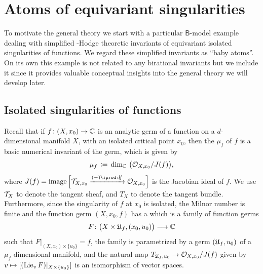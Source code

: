 \documentclass[twoside,leqno]{article}
\numberwithin{equation}{section}
\theoremstyle{plain}
\theoremstyle{definition}
\begin{document}




\section{Atoms of equivariant singularities} \label{sec:Bmodel}

To motivate the general theory we start with a particular $\mathsf{B}$-model example dealing with  simplified  \nc-Hodge theoretic invariants of equivariant isolated singularities of functions. We  regard these simplified invariants as ``baby atoms''. On its own this example is not related to any birational invariants but we include it since it provides valuable conceptual insights into the general theory we will develop later.

\subsection{Isolated singularities of functions} \label{ssec:fx0}

Recall that if $f \colon (X,x_{0}) \to \mathbb C$ is an analytic germ of a function on a $d$-dimensional manifold $X$, with an isolated critical point $x_{0}$, then the  $\mu_{f}$ of $f$ is a basic numerical invariant of the germ, which is given by 
\[
\mu_{f} \, \coloneqq \, \dim_{\mathbb C} \, \big( \mathcal O_{X,x_{0}}/J(f)\big),
\]
where $J(f)=\op{image}\Big[\cT_{X, x_0} \xrightarrow{(-)\iprod \, df} \cO_{X,x_0} \Big]$ is the Jacobian ideal of $f$.
We use $\mathcal T_X$ to denote the tangent sheaf, and $T_X$ to denote the tangent bundle.
Furthermore, since the singularity of $f$ at $x_{0}$ is isolated, the Milnor number is finite and the function germ $(X,x_{0},f)$ has a  which is a family of function germs
\[
F \colon \big(X\times \mathfrak{U}_{f},(x_{0},u_{0})\big) \longrightarrow \mathbb C
\]
such that $F|_{(X,x_{0})\times\{u_{0}\}} = f$, the family is parametrized by a germ $(\mathfrak{U}_{f},u_{0})$ of a $\mu_{f}$-dimensional mani\-fold, and the natural map 
$T_{\mathfrak{U}_{f},u_{0}} \to \mathcal O_{X,x_{0}}/J(f)$ given by $v \mapsto [(\operatorname{Lie}_v F)|_{X\times \{u_{0}\}}]$ is an isomorphism of vector spaces.
\end{document}
